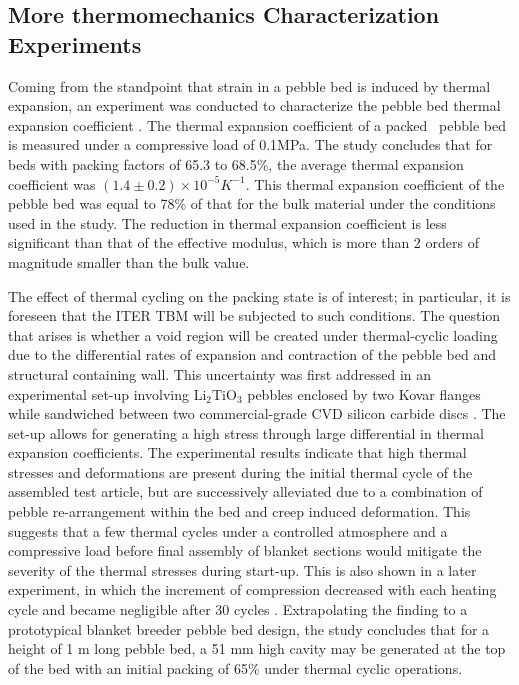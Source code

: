 \subsection{More thermomechanics Characterization Experiments}
Coming from the standpoint that strain in a pebble bed is induced by thermal expansion, an experiment was conducted to characterize the pebble bed thermal expansion coefficient \cite{Tanigawa:2007fc}.  The thermal expansion coefficient of a packed \lit~pebble bed is measured under a compressive load of 0.1MPa.  The study concludes that for beds with packing factors of 65.3 to 68.5\%, the average thermal expansion coefficient was $(1.4\pm0.2)\times10^{-5}K^{-1}$. This thermal expansion coefficient of the pebble bed was equal to 78\% of that for the bulk material under the conditions used in the study. The reduction in thermal expansion coefficient is less significant than that of the effective modulus, which is more than 2 orders of magnitude smaller than the bulk value. 


The effect of thermal cycling on the packing state is of interest; in particular, it is foreseen that the ITER TBM will be subjected to such conditions. The question that arises is whether a void region will be created under thermal-cyclic loading due to the differential rates of expansion and contraction of the pebble bed and structural containing wall. This uncertainty was first addressed in an experimental set-up involving Li$_2$TiO$_3$ pebbles enclosed by two Kovar flanges while sandwiched between two commercial-grade CVD silicon carbide discs \cite{Calderoni:2006ye}. The set-up allows for generating a high stress through large differential in thermal expansion coefficients. The experimental results indicate that high thermal stresses and deformations are present during the initial thermal cycle of the assembled test article, but are successively alleviated due to a combination of pebble re-arrangement within the bed and creep induced deformation. This suggests that a few thermal cycles under a controlled atmosphere and a compressive load before final assembly of blanket sections would mitigate the severity of the thermal stresses during start-up. This is also shown in a later experiment, in which the increment of compression decreased with each heating cycle and became negligible after 30 cycles \cite{Tanigawa:2010cr}. Extrapolating the finding to a prototypical blanket breeder pebble bed design, the study concludes that for a height of 1 m long pebble bed, a 51 mm high cavity may be generated at the top of the bed with an initial packing of 65\% under thermal cyclic operations.  



